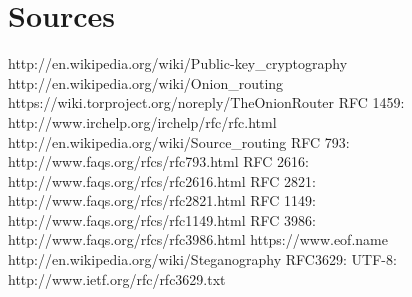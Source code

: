 \documentclass[12pt,a4paper]{book}
\begin{document}
\chapter{Sources}
\begin{thebibliography}{42}
 http://en.wikipedia.org/wiki/Public-key\_cryptography
 http://en.wikipedia.org/wiki/Onion\_routing
 https://wiki.torproject.org/noreply/TheOnionRouter
 RFC 1459: http://www.irchelp.org/irchelp/rfc/rfc.html
 http://en.wikipedia.org/wiki/Source\_routing
 RFC 793: http://www.faqs.org/rfcs/rfc793.html
 RFC 2616: http://www.faqs.org/rfcs/rfc2616.html
 RFC 2821: http://www.faqs.org/rfcs/rfc2821.html
 RFC 1149: http://www.faqs.org/rfcs/rfc1149.html
 RFC 3986: http://www.faqs.org/rfcs/rfc3986.html
 https://www.eof.name
 http://en.wikipedia.org/wiki/Steganography
 RFC3629: UTF-8: http://www.ietf.org/rfc/rfc3629.txt
\end{thebibliography}

\printindex
\end{document}
